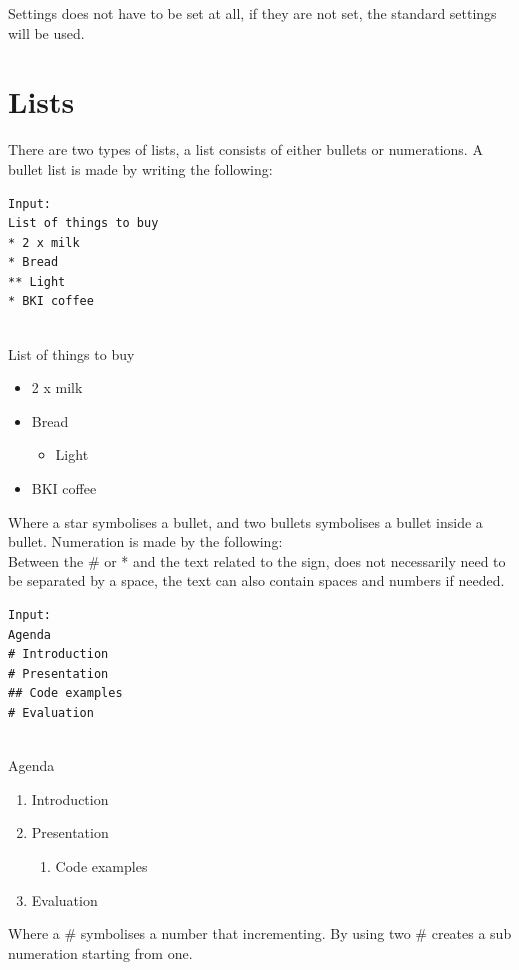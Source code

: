 Settings does not have to be set at all, if they are not set, the standard settings will be used.

\section{Lists}
There are two types of lists, a list consists of either bullets or numerations.
A bullet list is made by writing the following:\\

\begin{verbatim}
Input:
List of things to buy
* 2 x milk
* Bread
** Light
* BKI coffee
\end{verbatim}
 
 \\
List of things to buy
\begin{itemize}
\item 2 x milk
\item Bread
\begin{itemize}
\item Light
\end{itemize}
\item BKI coffee
\end{itemize}

Where a star symbolises a bullet, and two bullets symbolises a bullet inside a bullet.
Numeration is made by the following: \\
Between the \# or * and the text related to the sign, does not necessarily need to be separated by a space, the text can also contain spaces and numbers if needed.\\

\begin{verbatim}
Input:
Agenda
# Introduction
# Presentation
## Code examples
# Evaluation
\end{verbatim}

 \\
Agenda
\begin{enumerate}
\item Introduction
\item Presentation
\begin{enumerate}
\item Code examples
\end{enumerate}
\item Evaluation
\end{enumerate}

Where a \# symbolises a number that incrementing. By using two \# creates a sub numeration starting from one.


